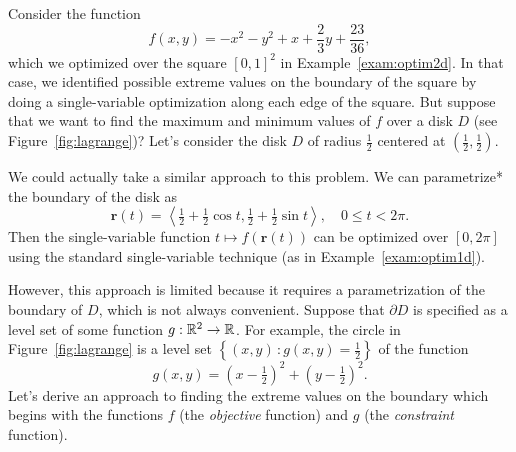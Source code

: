 \documentclass[svgnames]{report}
\begin{document}
  Consider the function
  \[
    f(x,y) = -x^2 - y^2 + x + \frac{2}{3} y + \frac{23}{36}, 
  \]
  which we optimized over the square $[0,1]^2$ in
  Example~\ref{exam:optim2d}. In that case, we identified possible
  extreme values on the boundary of the square by doing a
  single-variable optimization along each edge of the square. But
  suppose that we want to find the maximum and minimum values of $f$
  over a disk $D$ (see Figure~\ref{fig:lagrange})? Let's consider the
  disk $D$ of radius $\tfrac{1}{2}$ centered at
  $\left(\tfrac{1}{2}, \tfrac{1}{2}\right)$.

  We could actually take a similar approach to this problem. We can
  parametrize* the boundary of the disk as 
  \[
    \mathbf{r}(t) = \left\langle \tfrac{1}{2} + \tfrac{1}{2} \cos t,
    \tfrac{1}{2} + \tfrac{1}{2} \sin
    t \right\rangle, \quad 0 \leq t 
    < 2\pi. 
  \]
  Then the single-variable function $t\mapsto f(\mathbf{r}(t))$ can be
  optimized over $[0,2\pi]$ using the standard single-variable technique (as in
  Example~\ref{exam:optim1d}). 
  
  However, this approach is limited because it requires a
  parametrization of the boundary of $D$, which is not always
  convenient. Suppose that $\partial D$ is specified as a level set of
  some function $g: \mathbb{R}^2 \to \mathbb{R}$. For example, the
  circle in Figure~\ref{fig:lagrange} is a level set $\left\{(x,y) \, :
  g(x,y) = \tfrac{1}{2}\right\}$ of the function
  \[
    g(x,y) = \left(x-\tfrac{1}{2}\right)^2 + \left(y-\tfrac{1}{2}\right)^2. 
  \]
  Let's derive an approach to finding the extreme values on the
  boundary which begins with the functions $f$ (the \textit{objective}
  function) and $g$ (the \textit{constraint} function).
\end{document}
